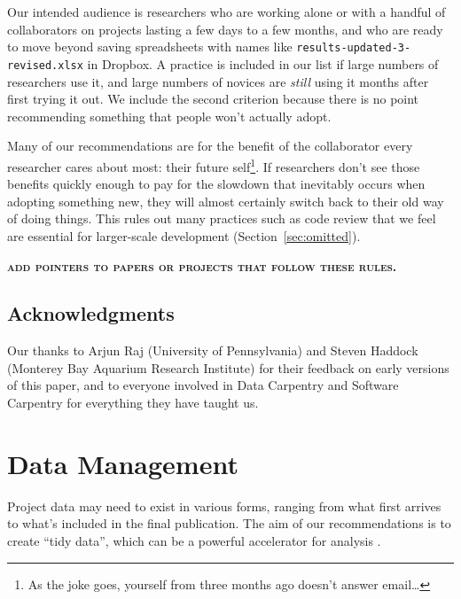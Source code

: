 \documentclass[10pt]{article}
\newcommand{\fixme}[1]{\textsc{\textbf{#1}}}
\begin{document}
Our intended audience is researchers who are working alone or with a
handful of collaborators on projects lasting a few days to a few
months, and who are ready to move beyond saving spreadsheets with
names like \texttt{results-updated-3-revised.xlsx} in Dropbox. A
practice is included in our list if large numbers of researchers use
it, and large numbers of novices are \emph{still} using it months
after first trying it out. We include the second criterion because
there is no point recommending something that people won't actually
adopt.

Many of our recommendations are
for the benefit of the collaborator every researcher cares about most:
their future self\footnote{As the joke goes, yourself from three months ago doesn't
  answer email{\ldots}}. If researchers don't see those benefits
quickly enough to pay for the slowdown that inevitably occurs when
adopting something new, they will almost certainly switch
back to their old way of doing things.
This rules out many practices
such as code review that we feel are essential for larger-scale
development (Section~\ref{sec:omitted}).

\fixme{add pointers to papers or projects that follow these rules.}

\subsection*{Acknowledgments}

Our thanks to Arjun Raj (University of Pennsylvania) and Steven
Haddock (Monterey Bay Aquarium Research Institute) for their feedback
on early versions of this paper, and to everyone involved in Data
Carpentry and Software Carpentry for everything they have taught us.

\section{Data Management}\label{sec:data}

Project data may need to exist in various forms, ranging from what
first arrives to what's included in the final publication.  The aim
of our recommendations is to create ``tidy data'', which can be
a powerful accelerator for analysis \cite{wickham2014,hart2015}.
\end{document}
